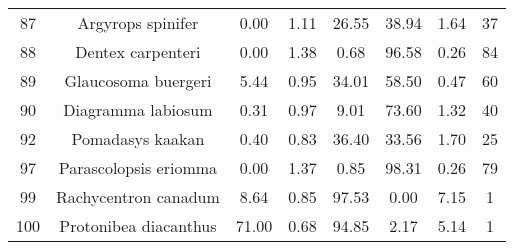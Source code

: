 \documentclass{report}\usepackage[]{graphicx}\usepackage[]{color}
\begin{document}
\begin{table}[ht]
{\begin{tabular}{cccccccc}
   87 & Argyrops spinifer & 0.00 & 1.11 & 26.55 & 38.94 & 1.64 & 37 \\ 
   88 & Dentex carpenteri & 0.00 & 1.38 & 0.68 & 96.58 & 0.26 & 84 \\ 
   89 & Glaucosoma buergeri & 5.44 & 0.95 & 34.01 & 58.50 & 0.47 & 60 \\ 
   90 & Diagramma labiosum & 0.31 & 0.97 & 9.01 & 73.60 & 1.32 & 40 \\ 
   92 & Pomadasys kaakan & 0.40 & 0.83 & 36.40 & 33.56 & 1.70 & 25 \\ 
   97 & Parascolopsis eriomma & 0.00 & 1.37 & 0.85 & 98.31 & 0.26 & 79 \\ 
   99 & Rachycentron canadum & 8.64 & 0.85 & 97.53 & 0.00 & 7.15 & 1 \\ 
  100 & Protonibea diacanthus & 71.00 & 0.68 & 94.85 & 2.17 & 5.14 & 1 \\ 
   \hline
\end{tabular}
}
\end{table}

\clearpage
\newpage
\end{document}
